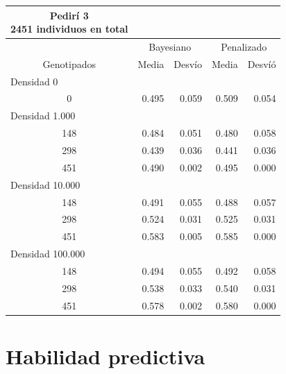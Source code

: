 \documentclass[11pt,spanish,a4paper,oneside,]{book} %
\begin{document}
\begin{longtable}{crrrr}
\caption*{
{\large Pedirí 3} \\ 
{\small 2451 individuos en total}
} \\ 
\toprule
 & \multicolumn{2}{c}{Bayesiano} & \multicolumn{2}{c}{Penalizado} \\ 
 \cmidrule(lr){2-3} \cmidrule(lr){4-5}
Genotipados & Media & Desvío & Media & Desvíó \\ 
\midrule
\multicolumn{1}{l}{Densidad 0} \\ 
\midrule
0 & 0.495 & 0.059 & 0.509 & 0.054 \\ 
\midrule
\multicolumn{1}{l}{Densidad 1.000} \\ 
\midrule
148 & 0.484 & 0.051 & 0.480 & 0.058 \\ 
298 & 0.439 & 0.036 & 0.441 & 0.036 \\ 
451 & 0.490 & 0.002 & 0.495 & 0.000 \\ 
\midrule
\multicolumn{1}{l}{Densidad 10.000} \\ 
\midrule
148 & 0.491 & 0.055 & 0.488 & 0.057 \\ 
298 & 0.524 & 0.031 & 0.525 & 0.031 \\ 
451 & 0.583 & 0.005 & 0.585 & 0.000 \\ 
\midrule
\multicolumn{1}{l}{Densidad 100.000} \\ 
\midrule
148 & 0.494 & 0.055 & 0.492 & 0.058 \\ 
298 & 0.538 & 0.033 & 0.540 & 0.031 \\ 
451 & 0.578 & 0.002 & 0.580 & 0.000 \\ 
 \bottomrule
\end{longtable}

\hypertarget{habilidad-predictiva-1}{%
\section{Habilidad predictiva}\label{habilidad-predictiva-1}}
\end{document}
